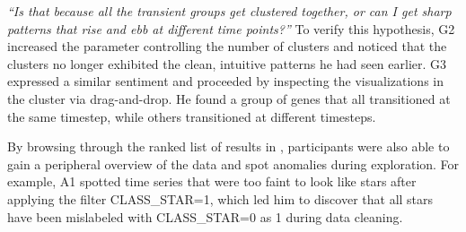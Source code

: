 \textit{``Is that because all the transient groups 
get clustered together, or can I get sharp patterns 
that rise and ebb at different time points?''} 
To verify this hypothesis, G2 increased the parameter controlling the number of clusters and noticed that the clusters
no longer exhibited the clean, 
intuitive patterns he had seen earlier. 
G3 expressed a similar sentiment and proceeded 
by inspecting the visualizations 
in the cluster via drag-and-drop. 
He found a group of genes that all transitioned 
at the same timestep, while others transitioned 
at different timesteps. 
\par By browsing through the ranked list of 
results in \zvpp, participants were also able to 
gain a peripheral overview of the data 
and spot anomalies during exploration. 
For example, A1 spotted time series 
that were too faint to look like stars 
after applying the filter CLASS\_STAR=1, 
which led him to discover that all stars 
have been mislabeled with CLASS\_STAR=0 as 1 during data cleaning. 
